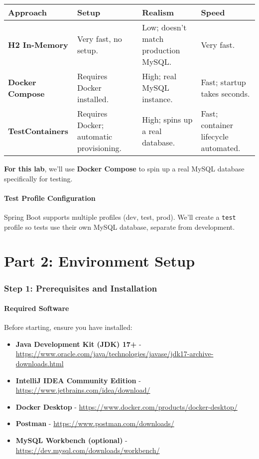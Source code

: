 \documentclass[12pt,a4paper]{article}
\begin{document}
\begin{table}[H]
\centering
\small
\begin{tabularx}{\textwidth}{|l|X|X|X|}
\toprule
\textbf{Approach} & \textbf{Setup} & \textbf{Realism} & \textbf{Speed} \\
\midrule
\textbf{H2 In-Memory} &
Very fast, no setup. &
Low; doesn't match production MySQL. &
Very fast. \\
\midrule
\textbf{Docker Compose} &
Requires Docker installed. &
High; real MySQL instance. &
Fast; startup takes seconds. \\
\midrule
\textbf{TestContainers} &
Requires Docker; automatic provisioning. &
High; spins up a real database. &
Fast; container lifecycle automated. \\
\bottomrule
\end{tabularx}
\end{table}

\textbf{For this lab}, we'll use \textbf{Docker Compose} to spin up a real MySQL database specifically for testing.

\subsection{Test Profile Configuration}

Spring Boot supports multiple profiles (dev, test, prod). We'll create a \texttt{test} profile so tests use their own MySQL database, separate from development.

\newpage

\part{Part 2: Environment Setup}

\section{Step 1: Prerequisites and Installation}

\subsection{Required Software}

Before starting, ensure you have installed:

\begin{itemize}
    \item \textbf{Java Development Kit (JDK) 17+} - \url{https://www.oracle.com/java/technologies/javase/jdk17-archive-downloads.html}
    \item \textbf{IntelliJ IDEA Community Edition} - \url{https://www.jetbrains.com/idea/download/}
    \item \textbf{Docker Desktop} - \url{https://www.docker.com/products/docker-desktop/}
    \item \textbf{Postman} - \url{https://www.postman.com/downloads/}
    \item \textbf{MySQL Workbench (optional)} - \url{https://dev.mysql.com/downloads/workbench/}
\end{itemize}
\end{document}
